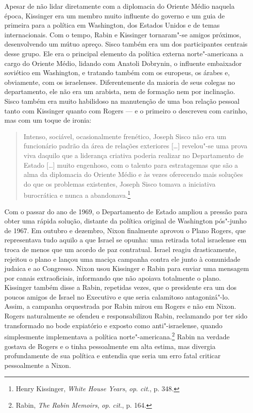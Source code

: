 Apesar de não lidar diretamente com a diplomacia do Oriente
Médio naquela época, Kissinger era um membro muito influente do governo e um guia de
primeira para a política em Washington, dos Estados Unidos e de temas internacionais.
Com o tempo, Rabin e Kissinger tornaram"-se amigos próximos,
desenvolvendo um mútuo apreço. Sisco também era um dos
participantes centrais desse grupo. Ele era o principal elemento da política
externa norte"-americana a cargo do Oriente Médio, lidando com Anatoli
Dobrynin, o influente embaixador soviético em Washington, e tratando também com os
europeus, os árabes e, obviamente, com os israelenses. Diferentemente da
maioria de seus colegas no departamento, ele não era um arabista, nem de
formação nem por inclinação. Sisco também era muito habilidoso na
manutenção de uma boa relação pessoal tanto com Kissinger quanto com
Rogers --- e o primeiro o descreveu com carinho, mas com um toque de ironia:

\begin{quote}
Intenso, sociável, ocasionalmente frenético, Joseph Sisco não era um
funcionário padrão da área de relações exteriores {[}\ldots{}{]} revelou"-se uma
prova viva daquilo que a liderança criativa poderia realizar no
Departamento de Estado {[}\ldots{}{]} muito engenhoso, com o talento para
estratagemas que são a alma da diplomacia do Oriente Médio e às vezes
oferecendo mais soluções do que os problemas existentes, Joseph Sisco
tomava a iniciativa burocrática e nunca a abandonava.\footnote{Henry Kissinger, 
\textit{White House Years}, \textit{op}. \textit{cit}., p. 348.}
\end{quote}

Com o passar do ano de 1969, o Departamento de Estado ampliou a pressão
para obter uma rápida solução, distante da política original de
Washington pós"-junho de 1967. Em outubro e dezembro, Nixon finalmente
aprovou o Plano Rogers, que representava tudo aquilo a que Israel se
opunha: uma retirada total israelense em troca de menos que um acordo de
paz contratual. Israel reagiu drasticamente, rejeitou o plano e lançou
uma maciça campanha contra ele junto à comunidade judaica e ao
Congresso. Nixon usou Kissinger e Rabin para enviar uma mensagem por
canais extraoficiais, informando que não apoiava totalmente o plano.
Kissinger também disse a Rabin, repetidas vezes, que o presidente era um
dos poucos amigos de Israel no Executivo e que seria calamitoso
antagonizá"-lo. Assim, a campanha orquestrada por Rabin mirou em Rogers e
não em Nixon. Rogers naturalmente se ofendeu e responsabilizou Rabin,
reclamando por ter sido transformado no bode expiatório e exposto como
anti"-israelense, quando simplesmente implementava a política
norte"-americana.\footnote{Rabin, \textit{The Rabin Memoirs}, 
\textit{op}. \textit{cit}., p. 164.} Rabin na verdade gostava de Rogers e o tinha
pessoalmente em alta estima, mas divergia profundamente de sua política
e entendia que seria um erro fatal criticar pessoalmente a Nixon.

